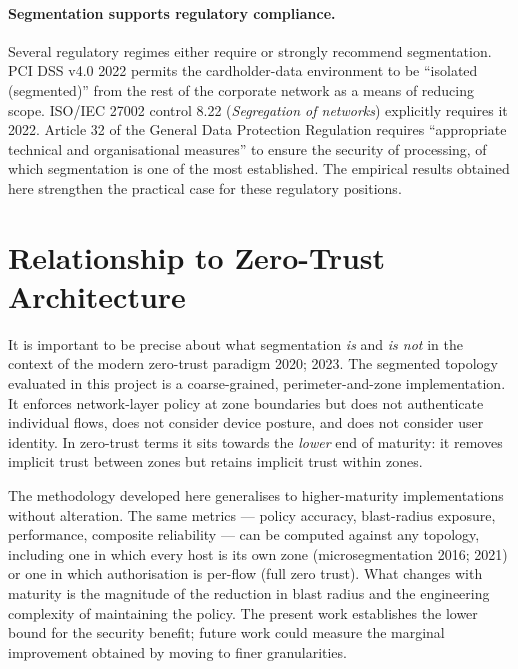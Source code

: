 \paragraph{Segmentation supports regulatory compliance.} Several regulatory regimes either require or strongly recommend segmentation. PCI DSS v4.0 \parencite{PCI Security Standards Council}{2022} permits the cardholder-data environment to be ``isolated (segmented)'' from the rest of the corporate network as a means of reducing scope. ISO/IEC 27002 control 8.22 (\textit{Segregation of networks}) explicitly requires it \parencite{ISO/IEC}{2022}. Article 32 of the General Data Protection Regulation requires ``appropriate technical and organisational measures'' to ensure the security of processing, of which segmentation is one of the most established. The empirical results obtained here strengthen the practical case for these regulatory positions.

\section{Relationship to Zero-Trust Architecture}

It is important to be precise about what segmentation \emph{is} and \emph{is not} in the context of the modern zero-trust paradigm \parencite{Rose et al.}{2020}; \parencite{Microsoft}{2023}. The segmented topology evaluated in this project is a coarse-grained, perimeter-and-zone implementation. It enforces network-layer policy at zone boundaries but does not authenticate individual flows, does not consider device posture, and does not consider user identity. In zero-trust terms it sits towards the \emph{lower} end of maturity: it removes implicit trust between zones but retains implicit trust within zones.

The methodology developed here generalises to higher-maturity implementations without alteration. The same metrics --- policy accuracy, blast-radius exposure, performance, composite reliability --- can be computed against any topology, including one in which every host is its own zone (microsegmentation \parencite{NIST}{2016}; \parencite{VMware}{2021}) or one in which authorisation is per-flow (full zero trust). What changes with maturity is the magnitude of the reduction in blast radius and the engineering complexity of maintaining the policy. The present work establishes the lower bound for the security benefit; future work could measure the marginal improvement obtained by moving to finer granularities.

